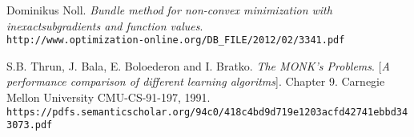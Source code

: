 \begin{thebibliography}{9}
	Dominikus Noll.
	\textit{Bundle method for non-convex minimization with inexactsubgradients and function values}. 
	\\\texttt{http://www.optimization-online.org/DB\_FILE/2012/02/3341.pdf}

	S.B. Thrun, J. Bala, E. Boloederon and I. Bratko.
	\textit{The MONK's Problems}. 
	[\textit{A performance comparison of different learning algoritms}]. Chapter 9.
	Carnegie Mellon University CMU-CS-91-197, 1991.
	\\\texttt{https://pdfs.semanticscholar.org/94c0/418c4bd9d719e1203acfd42741ebbd343073.pdf}
	

 

	
\end{thebibliography}



